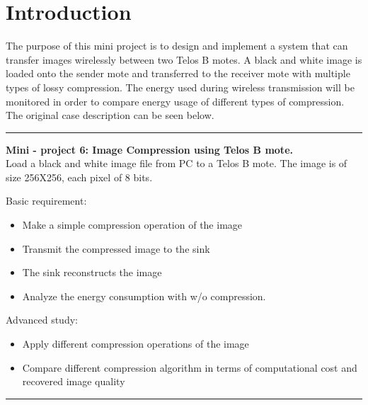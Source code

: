 \section{Introduction}

The purpose of this mini project is to design and implement a system that can transfer images wirelessly between two Telos B motes. 
A black and white image is loaded onto the sender mote and transferred to the receiver mote with multiple types of lossy compression. 
The energy used during wireless transmission will be monitored in order to compare energy usage of different types  of compression. 
The original case description can be seen below.
\begin{center}
\noindent\rule{4cm}{0.4pt}
\end{center}
\textbf{Mini - project 6: Image Compression using Telos B mote.}\\
Load a black and white image file from PC to a Telos B mote. 
The image is of size 256X256, each pixel of 8 bits.

Basic requirement:

\begin{itemize}
\item Make a simple compression operation of the image
\item Transmit the compressed image to the sink
\item The sink reconstructs the image
\item Analyze the energy consumption with w/o compression. 
\end{itemize}

Advanced study:

\begin{itemize}
\item Apply different compression operations of the image
\item Compare different compression algorithm in terms of computational cost and recovered image quality
\end{itemize}
\begin{center}
\noindent\rule{4cm}{0.4pt}
\end{center}

